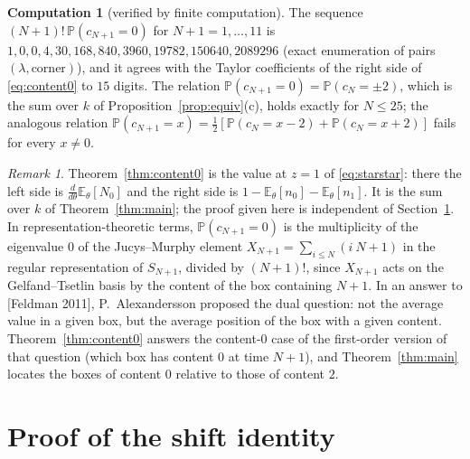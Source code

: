 \documentclass[11pt]{article}
\theoremstyle{definition}
\newtheorem{computation}[theorem]{Computation}
\theoremstyle{remark}
\newtheorem{remark}[theorem]{Remark}
\newcommand{\E}{\mathbb{E}}
\newcommand{\Prob}{\mathbb{P}}
\begin{document}
\begin{computation}[verified by finite computation]\label{comp:content0}
The sequence $(N+1)!\,\Prob(c_{N+1}=0)$ for $N+1=1,\dots,11$ is $1,0,0,4,30,168,840,3960,19782,150640,2089296$ (exact enumeration of pairs $(\lambda,\text{corner})$), and it agrees with the Taylor coefficients of the right side of \eqref{eq:content0} to $15$ digits. The relation $\Prob(c_{N+1}=0)=\Prob(c_N=\pm2)$, which is the sum over $k$ of Proposition~\ref{prop:equiv}(c), holds exactly for $N\le25$; the analogous relation $\Prob(c_{N+1}=x)=\frac12[\Prob(c_N=x-2)+\Prob(c_N=x+2)]$ fails for every $x\ne0$.
\end{computation}

\begin{remark}
Theorem~\ref{thm:content0} is the value at $z=1$ of \eqref{eq:starstar}: there the left side is $\frac{d}{d\theta}\E_\theta[N_0]$ and the right side is $1-\E_\theta[n_0]-\E_\theta[n_1]$. It is the sum over $k$ of Theorem~\ref{thm:main}; the proof given here is independent of Section~\ref{sec:proof}. In representation-theoretic terms, $\Prob(c_{N+1}=0)$ is the multiplicity of the eigenvalue $0$ of the Jucys--Murphy element $X_{N+1}=\sum_{i\le N}(i\ N{+}1)$ in the regular representation of $S_{N+1}$, divided by $(N+1)!$, since $X_{N+1}$ acts on the Gelfand--Tsetlin basis by the content of the box containing $N+1$. In an answer to [Feldman 2011], P.~Alexandersson proposed the dual question: not the average value in a given box, but the average position of the box with a given content. Theorem~\ref{thm:content0} answers the content-$0$ case of the first-order version of that question (which box has content $0$ at time $N+1$), and Theorem~\ref{thm:main} locates the boxes of content $0$ relative to those of content $2$.
\end{remark}

\section{Proof of the shift identity}\label{sec:proof}
\end{document}
